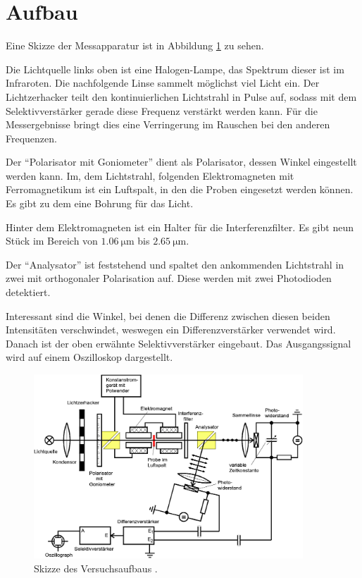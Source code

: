 \section{Aufbau}
\label{sec:Aufbau}
Eine Skizze der Messapparatur ist in Abbildung \ref{fig:aufbau} zu sehen.

Die Lichtquelle links oben ist eine Halogen-Lampe, das Spektrum dieser ist
im Infraroten. Die nachfolgende Linse sammelt möglichst viel Licht ein.
Der Lichtzerhacker teilt den kontinuierlichen Lichtstrahl in Pulse auf,
sodass mit dem Selektivverstärker gerade diese Frequenz verstärkt werden kann.
Für die Messergebnisse bringt dies eine Verringerung im Rauschen bei den anderen Frequenzen.

Der \enquote{Polarisator mit Goniometer} dient als Polarisator,
dessen Winkel eingestellt werden kann.
Im, dem Lichtstrahl, folgenden Elektromagneten mit Ferromagnetikum ist ein
Luftspalt, in den die Proben eingesetzt werden können.
Es gibt zu dem eine Bohrung für das Licht.

Hinter dem Elektromagneten ist ein Halter für die Interferenzfilter.
Es gibt neun Stück im Bereich von $\SI{1.06}{\micro\meter}$ bis $\SI{2.65}{\micro\meter}$.

Der \enquote{Analysator} ist feststehend und spaltet den ankommenden Lichtstrahl
in zwei mit orthogonaler Polarisation auf.
Diese werden mit zwei Photodioden detektiert.

Interessant sind die Winkel, bei denen die Differenz zwischen diesen beiden
Intensitäten verschwindet, weswegen ein Differenzverstärker verwendet wird.
Danach ist der oben erwähnte Selektivverstärker eingebaut. 
Das Ausgangssignal wird auf einem Oszilloskop dargestellt.

\begin{figure}
  \centering
  \includegraphics[width=0.9\textwidth]{images/aufbau.png}
  \caption{Skizze des Versuchsaufbaus \cite{anleitung}.}
  \label{fig:aufbau}
\end{figure}

